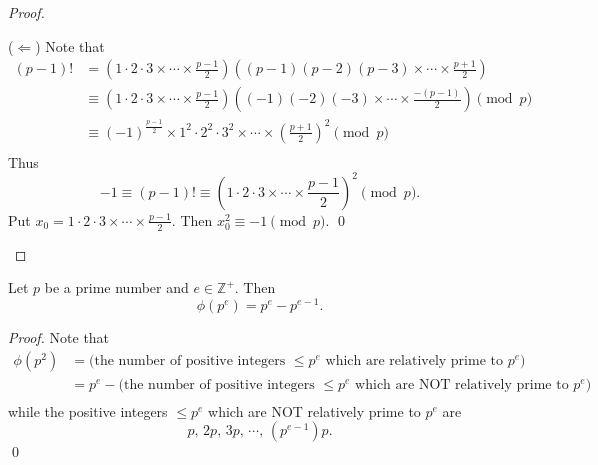 \begin{proof}
\begin{enumerate}
        ($\Leftarrow$) Note that
        \begin{align*}
            \left(p-1\right)!
            &= \left(1 \cdot 2 \cdot 3 \times \cdots \times \frac{p-1}{2}\right)
            \left(\left(p-1\right) \left(p-2\right) \left(p-3\right) \times \cdots \times \frac{p+1}{2}\right) \\
            &\equiv \left(1 \cdot 2 \cdot 3 \times \cdots \times \frac{p-1}{2}\right)
            \left(\left(-1\right) \left(-2\right) \left(-3\right) \times \cdots \times \frac{-\left(p-1\right)}{2}\right)
            \pmod{p} \\
            &\equiv \left(-1\right)^{\frac{p-1}{2}} \times 1^2 \cdot 2^2 \cdot 3^2 \times \cdots \times \left(\frac{p+1}{2}\right)^2
            \pmod{p} \\
        \end{align*}
        Thus
        \[
            -1 \equiv \left(p-1\right)! \equiv \left(1 \cdot 2 \cdot 3 \times \cdots \times \frac{p-1}{2}\right)^2 \pmod{p}.
        \]
        Put $x_0 = 1 \cdot 2 \cdot 3 \times \cdots \times \frac{p-1}{2}$. Then $x_0^2 \equiv -1\pmod{p}$.
        \qed
    \end{enumerate}
\end{proof}

\begin{theorem}
    Let $p$ be a prime number and $e \in \mathbb{Z}^+$. Then
    \[
        \phi\left(p^e\right) = p^e - p^{e-1}.    
    \]
\end{theorem}

\begin{proof}
    Note that
    \begin{align*}
        \phi\left(p^2\right) &= \mbox{(the number of positive integers $\leq p^e$ which are relatively prime to $p^e$)} \\
        &= p^e - \mbox{(the number of positive integers $\leq p^e$ which are NOT relatively prime to $p^e$)} \\
    \end{align*}
    while the positive integers $\leq p^e$ which are NOT relatively prime to $p^e$ are
    \[
        p,\,2p,\,3p,\,\cdots,\,\left(p^{e-1}\right)p.
    \]
    \qed
\end{proof}

